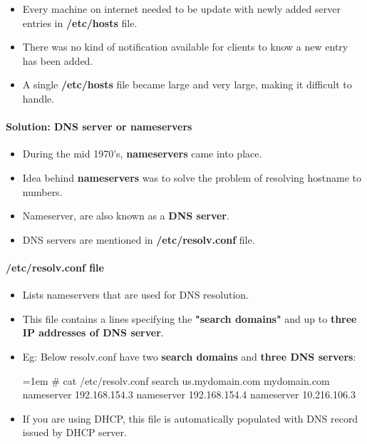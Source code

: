\setlength{\columnsep}{3pt}
\begin{flushleft}
	\bigskip
	\begin{itemize}
		\item Every machine on internet needed to be update with newly added server entries in \textbf{/etc/hosts} file.
		\bigskip
		\item There was no kind of notification available for clients to know a new entry has been added.
		\bigskip		
		\item A single \textbf{/etc/hosts} file became large and very large, making it difficult to handle.
	\end{itemize}

	\paragraph{Solution: DNS server or nameservers}
	\begin{itemize}
		\item During the mid 1970's, \textbf{nameservers} came into place. 
		\bigskip
		\item Idea behind \textbf{nameservers} was to solve the problem of resolving hostname to numbers.
		\bigskip
		\item Nameserver, are also known as a \textbf{DNS server}.
		\bigskip
		\item DNS servers are mentioned in \textbf{/etc/resolv.conf} file.		
	\end{itemize}


	\newpage
	\paragraph{/etc/resolv.conf file}
	\begin{itemize}
		\item Lists nameservers that are used for DNS resolution. 
		\item This file contains a lines specifying the \textbf{"search domains"} and up to \textbf{three IP addresses of DNS server}. 
		\item Eg: Below resolv.conf have two \textbf{search domains} and \textbf{three DNS servers}:
		\begin{tcolorbox}[breakable,notitle,boxrule=-0pt,colback=black,colframe=black]
			\color{green}
			\font=1em
			\# cat /etc/resolv.conf
			\newline
			\color{white}
			search us.mydomain.com mydomain.com
			\newline
			nameserver 192.168.154.3
			\newline
			nameserver 192.168.154.4
			\newline
			nameserver 10.216.106.3
			\font=4pt
		\end{tcolorbox}
		\item If you are using DHCP, this file is automatically populated with DNS record issued by DHCP server.
		

\end{itemize}
\end{flushleft}
